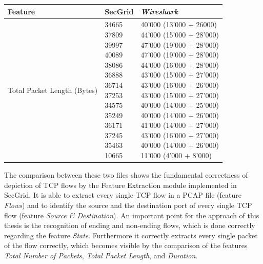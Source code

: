 \begin{center}
\begin{longtable}{ |l|l|l| }
\hline
Feature & SecGrid & \textit{Wireshark} \\
\hline
Total Packet Length (Bytes) & \makecell{
34665 \\
37809 \\
39997 \\
40089 \\
38086 \\
36888 \\
36714 \\
37253 \\
34575 \\
35249 \\
36171 \\
37245 \\
35463 \\
10665 \\
} & \makecell{
40'000 (13'000 + 26000) \\
44'000 (15'000 + 28'000)\\
47'000 (19'000 + 28'000)\\
47'000 (19'000 + 28'000)\\
44'000 (16'000 + 28'000)\\
43'000 (15'000 + 27'000)\\
43'000 (16'000 + 26'000)\\
43'000 (15'000 + 27'000)\\
40'000 (14'000 + 25'000)\\
40'000 (14'000 + 26'000)\\
41'000 (14'000 + 27'000)\\
43'000 (16'000 + 27'000)\\
40'000 (14'000 + 26'000)\\
11'000 (4'000 + 8'000)\\
} \\
\hline
\end{longtable}
\label{tab:tot_len}
\end{center}

The comparison between these two files shows the fundamental correctness of depiction of TCP flows by the Feature Extraction module implemented in SecGrid. It is able to extract every single TCP flow in a PCAP file (feature \textit{Flows}) and to identify the source and the destination port of every single TCP flow (feature \textit{Source \& Destination}). An important point for the approach of this thesis is the recognition of ending and non-ending flows, which is done correctly regarding the feature \textit{State}. Furthermore it correctly extracts every single packet of the flow correctly, which becomes visible by the comparison of the features \textit{Total Number of Packets}, \textit{Total Packet Length}, and \textit{Duration}.

